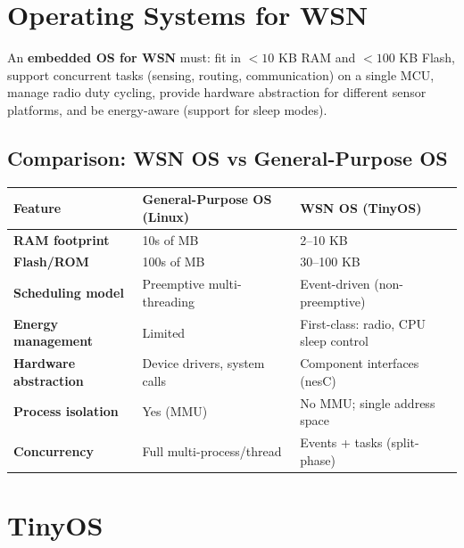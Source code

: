 \documentclass[12pt,a4paper]{article}
\renewcommand{\arraystretch}{1.45}
\begin{document}
\section{Operating Systems for WSN}

\begin{tcolorbox}[defbox, title={\textbf{WSN Operating System --- Requirements}}]
An \textbf{embedded OS for WSN} must: fit in $< 10$ KB RAM and $< 100$ KB Flash, support concurrent tasks (sensing, routing, communication) on a single MCU, manage radio duty cycling, provide hardware abstraction for different sensor platforms, and be energy-aware (support for sleep modes).
\end{tcolorbox}

\subsection{Comparison: WSN OS vs General-Purpose OS}

\par\noindent
{\renewcommand{\arraystretch}{1.5}%
\begin{tabularx}{\linewidth}{|B{3.0cm}|Y|Y|}
\hline
\textbf{Feature} & \textbf{General-Purpose OS (Linux)} & \textbf{WSN OS (TinyOS)} \\
\hline
\textbf{RAM footprint} & 10s of MB & 2--10 KB \\
\hline
\textbf{Flash/ROM} & 100s of MB & 30--100 KB \\
\hline
\textbf{Scheduling model} & Preemptive multi-threading & Event-driven (non-preemptive) \\
\hline
\textbf{Energy management} & Limited & First-class: radio, CPU sleep control \\
\hline
\textbf{Hardware abstraction} & Device drivers, system calls & Component interfaces (nesC) \\
\hline
\textbf{Process isolation} & Yes (MMU) & No MMU; single address space \\
\hline
\textbf{Concurrency} & Full multi-process/thread & Events + tasks (split-phase) \\
\hline
\end{tabularx}}

\section{TinyOS}
\end{document}
